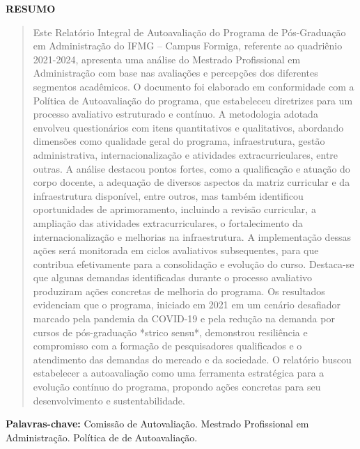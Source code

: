 \newenvironment{meuresumo}{
  \clearpage
  \small
  \vspace{-1cm}
  \begin{center}
    \bfseries RESUMO
    \vspace{0.5em}
  \end{center}
  \begin{quote}
}{
  \end{quote}
  \vspace{-1.1em}
  \begin{center}
  \begin{minipage}{0.87\textwidth} 
  \textbf{Palavras-chave:} Comissão de Autovaliação. 
  Mestrado Profissional em Administração. Política de de Autoavaliação.
  \end{minipage}
  \end{center}
  \clearpage
}

\begin{meuresumo}
Este Relatório Integral de Autoavaliação do Programa de Pós-Graduação em 
Administração do IFMG – Campus Formiga, referente ao quadriênio 2021-2024, 
apresenta uma análise do Mestrado Profissional em Administração 
com base nas avaliações e percepções dos diferentes segmentos acadêmicos. 
O documento foi elaborado em conformidade com a Política de Autoavaliação 
do programa, que estabeleceu diretrizes para um processo avaliativo 
estruturado e contínuo. A metodologia adotada envolveu questionários com 
itens quantitativos e qualitativos, abordando dimensões como qualidade geral 
do programa, infraestrutura, gestão administrativa, internacionalização e 
atividades extracurriculares, entre outras. A análise destacou pontos 
fortes, como a qualificação e atuação do corpo docente, a adequação 
de diversos aspectos da matriz curricular e da infraestrutura disponível, 
entre outros, mas também identificou oportunidades de aprimoramento, 
incluindo a revisão curricular, a ampliação das atividades extracurriculares, 
o fortalecimento da internacionalização e melhorias na infraestrutura. A 
implementação dessas ações será monitorada em ciclos avaliativos subsequentes, 
para que contribua efetivamente para a consolidação e evolução do curso. 
Destaca-se que algunas demandas identificadas durante o processo avaliativo 
produziram ações concretas de melhoria do programa. Os resultados evidenciam 
que o programa, iniciado em 2021 em um cenário desafiador marcado pela 
pandemia da COVID-19 e pela redução na demanda por cursos de pós-graduação 
*strico sensu*, demonstrou resiliência e compromisso com a formação de 
pesquisadores qualificados e o atendimento das demandas do mercado e 
da sociedade. O relatório buscou estabelecer a autoavaliação como uma 
ferramenta estratégica para a evolução contínuo do programa, propondo 
ações concretas para seu desenvolvimento e sustentabilidade. 
\end{meuresumo}



\clearpage
{}



